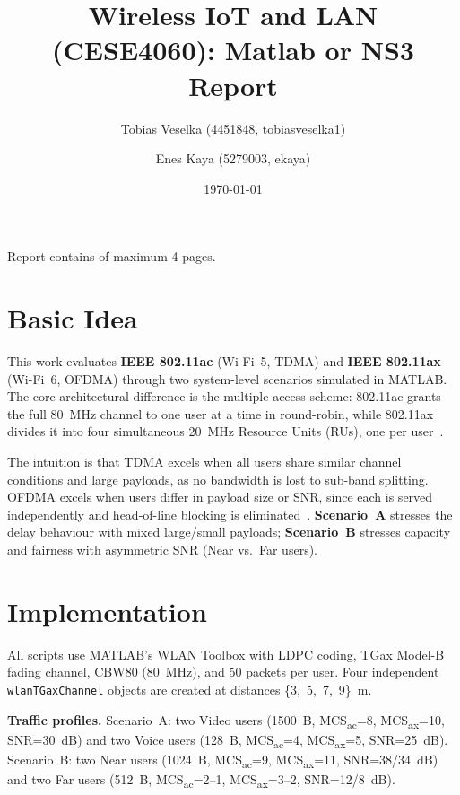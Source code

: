\documentclass[twocolumn]{article}
\title{\large{\textbf{Wireless IoT and LAN (CESE4060): Matlab or NS3 Report}}}
\author{
    \small Tobias Veselka (4451848, tobiasveselka1) \and
    \small Enes Kaya (5279003, ekaya)
}
\date{\today}
\begin{document}
\maketitle
\begin{center}
    \footnotesize{Report contains \pageref{LastPage} of maximum 4 pages.}
\end{center}

\section{Basic Idea}

This work evaluates \textbf{IEEE 802.11ac} (Wi-Fi~5, TDMA) and
\textbf{IEEE 802.11ax} (Wi-Fi~6, OFDMA) through two system-level scenarios
simulated in MATLAB. The core architectural difference is the multiple-access
scheme: 802.11ac grants the full 80~MHz channel to one user at a time in
round-robin, while 802.11ax divides it into four simultaneous 20~MHz Resource
Units (RUs), one per user~\cite{khorov2019}.

The intuition is that TDMA excels when all users share similar channel
conditions and large payloads, as no bandwidth is lost to sub-band splitting.
OFDMA excels when users differ in payload size or SNR, since each is served
independently and head-of-line blocking is eliminated~\cite{bellalta2016}.
\textbf{Scenario~A} stresses the delay behaviour with mixed large/small
payloads; \textbf{Scenario~B} stresses capacity and fairness with asymmetric
SNR (Near vs.\ Far users).

\section{Implementation}

All scripts use MATLAB's WLAN Toolbox with LDPC coding, TGax Model-B fading
channel, CBW80 (80~MHz), and 50 packets per user. Four independent
\texttt{wlanTGaxChannel} objects are created at distances \{3,~5,~7,~9\}~m.

\textbf{Traffic profiles.}
Scenario~A: two Video users (1500~B, MCS\textsubscript{ac}=8,
MCS\textsubscript{ax}=10, SNR=30~dB) and two Voice users (128~B,
MCS\textsubscript{ac}=4, MCS\textsubscript{ax}=5, SNR=25~dB).
Scenario~B: two Near users (1024~B, MCS\textsubscript{ac}=9,
MCS\textsubscript{ax}=11, SNR=38/34~dB) and two Far users (512~B,
MCS\textsubscript{ac}=2--1, MCS\textsubscript{ax}=3--2, SNR=12/8~dB).
\end{document}
